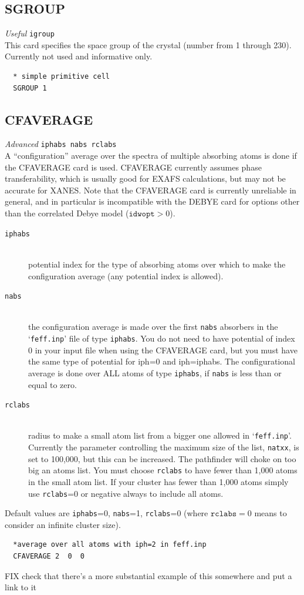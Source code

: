 \documentclass[11pt,oneside]{report} %
\renewcommand{\htmlref}[2]{\hyperlink{#2}{#1}}
\newenvironment{Card}[4]%
      {\vspace{3ex}%
        \subsection{#1}
        \quad\textsl{#3}\newline
        \quad\texttt{#2}\newline%
        \label{card:#4}\\}
      {}
\newcommand{\file}[1]{`\texttt{#1}'}
\renewcommand{\htmlref}[2]{{#1}} %
\begin{document}
\begin{Card}{SGROUP}{igroup}{Useful}{sgr}
  This card specifies the space group of the crystal (number from 1 through 230).  Currently not used and informative only.
\begin{verbatim}
  * simple primitive cell
  SGROUP 1
\end{verbatim}
\end{Card}



\begin{Card}{CFAVERAGE}{iphabs nabs rclabs}{Advanced}{cfa}
  A ``configuration'' average over the spectra of multiple 
  absorbing atoms is done if the CFAVERAGE card is used. 
  CFAVERAGE currently assumes phase transferability, which 
  is usually good for EXAFS calculations, but may not be 
  accurate for XANES. Note that the CFAVERAGE card is currently
  unreliable in general, and in particular is  
  incompatible with the \htmlref{DEBYE}{card:deb2} card for 
  options other than the correlated Debye model ($\mathtt{idwopt} > 0$).
  \begin{description}
  \item[\texttt{iphabs}]\hfill\\ potential index for the type of absorbing atoms  
    over which to make the configuration average (any potential index is allowed).
  \item[\texttt{nabs}]\hfill\\ the configuration average is made over
    the first \texttt{nabs} absorbers in the \file{feff.inp} file of
    type \texttt{iphabs}. You do not need to have potential of index 0
    in your input file when using the CFAVERAGE card, but you must
    have the same type of potential for iph=0 and iph=iphabs. The
    configurational average is done over ALL atoms of type
    \texttt{iphabs}, if \texttt{nabs} is less than or equal to zero.
  \item[\texttt{rclabs}]\hfill\\ radius to make a small atom list from a
    bigger one allowed in \file{feff.inp}. Currently the parameter
    controlling the maximum size of the list, \texttt{natxx}, is set to
    100,000, but this can be increased. The pathfinder will choke on too
    big an atoms list. You must choose \texttt{rclabs} to have fewer
    than 1,000 atoms in the small atom list. If your cluster has fewer than 1,000
    atoms simply use \texttt{rclabs}=0 or negative always to include
    all atoms.
  \end{description}
  Default values are \texttt{iphabs}=0, \texttt{nabs}=1,
  \texttt{rclabs}=0 (where $\mathtt{rclabs}=0$ means to consider an
  infinite cluster size).
\begin{verbatim}
  *average over all atoms with iph=2 in feff.inp
  CFAVERAGE 2  0  0
\end{verbatim}
\end{Card}
FIX check that there's a more substantial example of this somewhere and put a link to it
\end{document}
